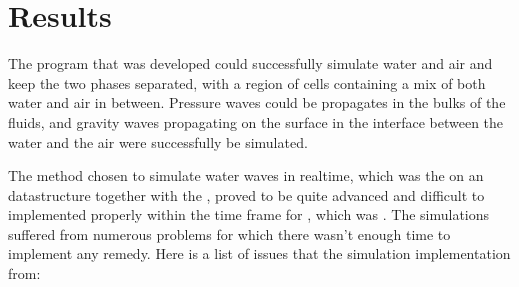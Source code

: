\chapter{Results}


The program that was developed could successfully simulate water and air and keep the two phases separated, with a region of cells containing a mix of both water and air in between. Pressure waves could be propagates in the bulks of the fluids, and gravity waves propagating on the surface in the interface between the water and the air were successfully be simulated.


The method chosen to simulate water waves in realtime, which was the \FVM on an \octree datastructure together with the \VOF, proved to be quite advanced and difficult to implemented properly within the time frame for \thismasterthesiswork, which was \masterthesisworktime. The simulations suffered from numerous problems for which there wasn't enough time to implement any remedy. Here is a list of issues that the simulation implementation from:



